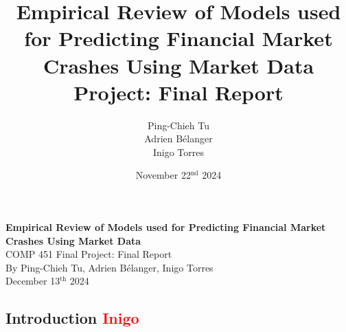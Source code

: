 \documentclass[12pt, letterpaper]{article}
\title{
    Empirical Review of Models used for Predicting Financial Market Crashes Using Market Data 
    \vspace{1em} \\
    {\large Project: Final Report}
}
\author{\normalsize Ping-Chieh Tu \\ Adrien Bélanger \\ Inigo Torres}
\date{\vspace{2em} November 22$^{\text{nd}}$ 2024}
\begin{document}
\begin{titlepage}
    \centering
    \vspace*{2in}
    {\LARGE \textbf{Empirical Review of Models used for Predicting Financial Market Crashes Using Market Data}}\\
    \vspace*{0.5in}
    {\large COMP 451 Final Project: Final Report}\\[4in]
    \normalsize
    By Ping-Chieh Tu, Adrien Bélanger, Inigo Torres \\ [3em]
    December 13$^{\text{th}}$ 2024
\end{titlepage}
\pagebreak

\subsection*{Introduction \textcolor{red}{Inigo}}
\end{document}
